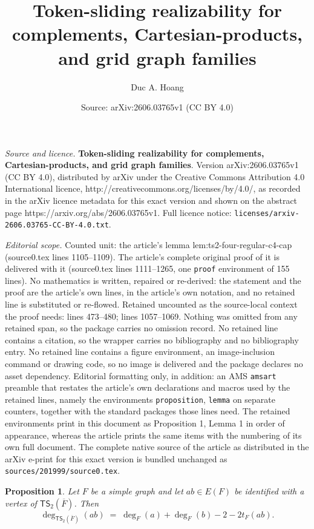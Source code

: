 \documentclass[10pt,a4paper]{amsart}
\title{\textbf{Token-sliding realizability for complements, Cartesian-products, and grid graph families}}
\author{Duc A. Hoang}
\date{Source: arXiv:2606.03765v1 (CC BY 4.0)}
\newtheorem{proposition}{Proposition}
\newcommand{\TSsym}{\mathsf{TS}}
\begin{document}
\maketitle

\noindent\emph{Source and licence.} \textbf{Token-sliding realizability for complements, Cartesian-products, and grid graph families}. Version arXiv:2606.03765v1 (CC BY 4.0), distributed by arXiv under the Creative Commons Attribution 4.0 International licence, http://creativecommons.org/licenses/by/4.0/, as recorded in the arXiv licence metadata for this exact version and shown on the abstract page https://arxiv.org/abs/2606.03765v1. Full licence notice: \texttt{licenses/arxiv-2606.03765-CC-BY-4.0.txt}.\par\smallskip

\noindent\textit{Editorial scope.} Counted unit: the article's lemma lem:ts2-four-regular-c4-cap (source0.tex lines 1105--1109). The article's complete original proof of it is delivered with it (source0.tex lines 1111--1265, one \texttt{proof} environment of 155 lines). No mathematics is written, repaired or re-derived: the statement and the proof are the article's own lines, in the article's own notation, and no retained line is substituted or re-flowed.  Retained uncounted as the source-local context the proof needs: lines 473--480; lines 1057--1069.  Nothing was omitted from any retained span, so the package carries no omission record.  No retained line contains a citation, so the wrapper carries no bibliography and no bibliography entry.  No retained line contains a figure environment, an image-inclusion command or drawing code, so no image is delivered and the package declares no asset dependency.  Editorial formatting only, in addition: an AMS \texttt{amsart} preamble that restates the article's own declarations and macros used by the retained lines, namely the environments \texttt{proposition}, \texttt{lemma} on separate counters, together with the standard packages those lines need.  The retained environments print in this document as Proposition 1, Lemma 1 in order of appearance, whereas the article prints the same items with the numbering of its own full document.  The complete native source of the article as distributed in the arXiv e-print for this exact version is bundled unchanged as \texttt{sources/201999/source0.tex}.
\begin{proposition}
\label{prop:per-edge-degree}
Let $F$ be a simple graph and let $ab\in E(F)$ be identified with a vertex of $\TSsym_2(\overline{F})$.
Then
\[
 \deg_{\TSsym_2(\overline{F})}(ab)\;=\;\deg_F(a)+\deg_F(b)-2-2t_F(ab).
\]
\end{proposition}
\end{document}
